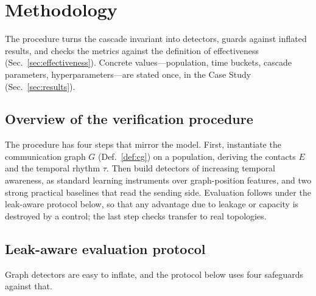 \section{Methodology}
\label{sec:method}

The procedure turns the cascade invariant into detectors, guards against inflated results, and checks the
metrics against the definition of effectiveness (Sec.~\ref{sec:effectiveness}). Concrete values---population,
time buckets, cascade parameters, hyperparameters---are stated once, in the Case Study (Sec.~\ref{sec:results}).

\subsection{Overview of the verification procedure}
\label{sec:m-overview}
The procedure has four steps that mirror the model. First, instantiate the communication graph $G$
(Def.~\ref{def:cg}) on a population, deriving the contacts $E$ and the temporal rhythm $\tau$. Then build
detectors of increasing temporal awareness, as standard learning instruments over graph-position features, and
two strong practical baselines that read the sending side. Evaluation follows under the leak-aware protocol
below, so that any advantage due to leakage or capacity is destroyed by a control; the last step checks
transfer to real topologies.

\subsection{Leak-aware evaluation protocol}
\label{sec:eval}
Graph detectors are easy to inflate, and the protocol below uses four safeguards against that.

